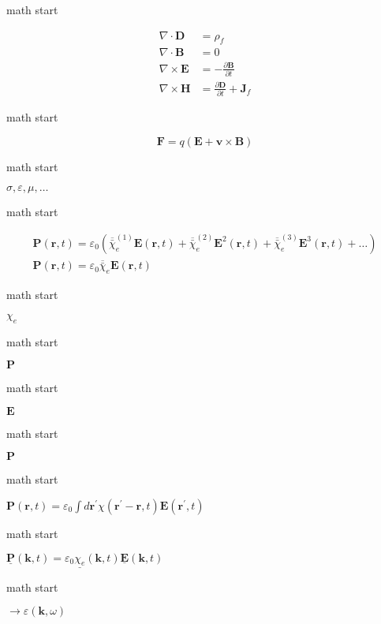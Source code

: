 math start

\[\begin{aligned}
\nabla\cdot\mathbf{D}&= \rho_f\\
\nabla\cdot\mathbf{B}&= 0\\
\nabla\times\mathbf{E}&= -\frac{\partial\mathbf{B}}{\partial t}\\
\nabla\times\mathbf{H}&= \frac{\partial\mathbf{D}}{\partial t} + \mathbf{J}_f
\end{aligned}\]

math start

\[\mathbf{F}= q\left(\mathbf{E}+ \mathbf{v}\times \mathbf{B}\right)\]

math start

\(\sigma, \varepsilon, \mu,\dots\)

math start

\[\begin{array}{l}
  \mathbf{P}(\mathbf{r}, t)=\varepsilon_{0}\left(\overline{\bar{\chi}}_{e}^{(1)} \mathbf{E}(\mathbf{r}, t)+\overline{\bar{\chi}}_{e}^{(2)} \mathbf{E}^{2}(\mathbf{r}, t)+\overline{\bar{\chi}}_{e}^{(3)} \mathbf{E}^{3}(\mathbf{r}, t)+\ldots\right) \\
  \mathbf{P}(\mathbf{r}, t)=\varepsilon_{0} \overline{\bar{\chi}}_{e} \mathbf{E}(\mathbf{r}, t)
  \end{array}\]

math start

\(\chi_e\)

math start

\(\mathbf{P}\)

math start

\(\mathbf{E}\)

math start

\(\mathbf{P}\)

math start

\(\mathbf{P}(\mathbf{r}, t)=\varepsilon_{0} \int d \mathbf{r}^{\prime} \chi\left(\mathbf{r}^{\prime}-\mathbf{r}, t\right) \mathbf{E}\left(\mathbf{r}^{\prime}, t\right)\)

math start

\(\underline{\mathbf{P}}(\mathbf{k}, t)=\varepsilon_{0} \underline{\chi_{e}}(\mathbf{k}, t) \underline{\mathbf{E}}(\mathbf{k}, t)\)

math start

\(\to \varepsilon(\mathbf{k},\omega)\)
